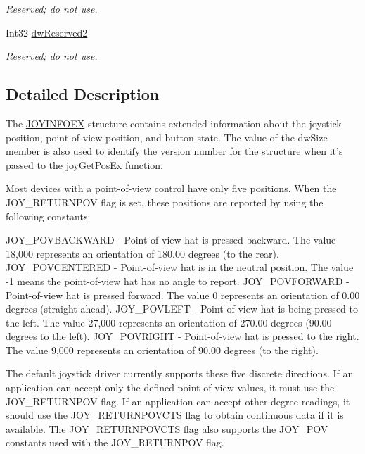 \begin{DoxyCompactItemize}
\begin{DoxyCompactList}\small\item\em Reserved; do not use. \item\end{DoxyCompactList}\item 
Int32 \hyperlink{struct_tao_1_1_platform_1_1_windows_1_1_winmm_1_1_j_o_y_i_n_f_o_e_x_a4636a7f59c4c68823da45e1479b93982}{dwReserved2}
\begin{DoxyCompactList}\small\item\em Reserved; do not use. \item\end{DoxyCompactList}\end{DoxyCompactItemize}


\subsection{Detailed Description}
The \hyperlink{struct_tao_1_1_platform_1_1_windows_1_1_winmm_1_1_j_o_y_i_n_f_o_e_x}{JOYINFOEX} structure contains extended information about the joystick position, point-\/of-\/view position, and button state. The value of the dwSize member is also used to identify the version number for the structure when it's passed to the joyGetPosEx function. 

Most devices with a point-\/of-\/view control have only five positions. When the JOY\_\-RETURNPOV flag is set, these positions are reported by using the following constants: 

JOY\_\-POVBACKWARD -\/ Point-\/of-\/view hat is pressed backward. The value 18,000 represents an orientation of 180.00 degrees (to the rear). JOY\_\-POVCENTERED -\/ Point-\/of-\/view hat is in the neutral position. The value -\/1 means the point-\/of-\/view hat has no angle to report. JOY\_\-POVFORWARD -\/ Point-\/of-\/view hat is pressed forward. The value 0 represents an orientation of 0.00 degrees (straight ahead). JOY\_\-POVLEFT -\/ Point-\/of-\/view hat is being pressed to the left. The value 27,000 represents an orientation of 270.00 degrees (90.00 degrees to the left). JOY\_\-POVRIGHT -\/ Point-\/of-\/view hat is pressed to the right. The value 9,000 represents an orientation of 90.00 degrees (to the right). 

The default joystick driver currently supports these five discrete directions. If an application can accept only the defined point-\/of-\/view values, it must use the JOY\_\-RETURNPOV flag. If an application can accept other degree readings, it should use the JOY\_\-RETURNPOVCTS flag to obtain continuous data if it is available. The JOY\_\-RETURNPOVCTS flag also supports the JOY\_\-POV constants used with the JOY\_\-RETURNPOV flag. 

